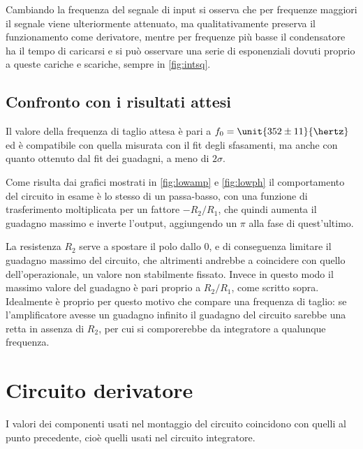 \documentclass[10pt,a4paper]{article}
\begin{document}
Cambiando la frequenza del segnale di input si osserva che per frequenze maggiori il segnale viene ulteriormente attenuato, ma qualitativamente preserva il funzionamento come derivatore, mentre per frequenze più basse il condensatore ha il tempo di caricarsi e si può osservare una serie di esponenziali dovuti proprio a queste cariche e scariche, sempre in \figurename{\ref{fig:intsq}}.


\subsection{Confronto con i risultati attesi}

Il valore della frequenza di taglio attesa è pari a $f_0 = \unit{352 \pm 11}{\hertz}$ ed è compatibile con quella misurata con il fit degli sfasamenti, ma anche con quanto ottenuto dal fit dei guadagni, a meno di $2\sigma$.

Come risulta dai grafici mostrati in \figurename{\ref{fig:lowamp}} e  \figurename{\ref{fig:lowph}} il comportamento del circuito in esame è lo stesso di un passa-basso, con una funzione di trasferimento moltiplicata per un fattore $-R_2/R_1$, che quindi aumenta il guadagno massimo e inverte l'output, aggiungendo un $\pi$ alla fase di quest'ultimo.

La resistenza $R_2$ serve a spostare il polo dallo 0, e di conseguenza limitare il guadagno massimo del circuito, che altrimenti andrebbe a coincidere con quello dell'operazionale, un valore non stabilmente fissato. Invece in questo modo il massimo valore del guadagno è pari proprio a  $R_2/R_1$, come scritto sopra.
Idealmente è proprio per questo motivo che compare una frequenza di taglio: se l'amplificatore avesse un guadagno infinito il guadagno del circuito sarebbe una retta in assenza di $R_2$, per cui si comporerebbe da integratore a qualunque frequenza.

\section{Circuito derivatore}

I valori dei componenti usati nel montaggio del circuito coincidono con quelli al punto precedente, cioè quelli usati nel circuito integratore.
\end{document}
